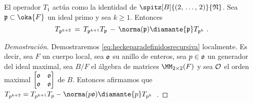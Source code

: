 \begin{propoHeckeParaDefinidosRecursiva}\label{thm:heckeparadefinidosrecursiva}
	El operador $T_{1}$ act\'{u}a como la identidad de
	$\spitz[B]{(2,\,\dots,\,2)}{\frak{N}}$. Sea $\frak{p}\subset\oka{F}$ un
	ideal primo y sea $k\geq 1$. Entonces
	\begin{equation}
		\label{eq:heckeparadefinidosrecursiva}
		T_{\frak{p}^{k+2}} \,=\,
			T_{\frak{p}^{k+1}}T_{\frak{p}} \,-\,\norma(\frak{p})
			\diamante{\frak{p}} T_{\frak{p}^{k}}
		\text{ .}
	\end{equation}
\end{propoHeckeParaDefinidosRecursiva}

\begin{proof}[Demostraci\'{o}n]
	Demostraremos \eqref{eq:heckeparadefinidosrecursiva} localmente. Es
	decir, sea $F$ un cuerpo local, sea $\frak{o}$ su anillo de enteros,
	sea $p\in\frak{o}$ un generador del ideal maximal, sea $B/F$ el
	\'{a}lgebra de matrices $\MM_{2\times 2}(F)$ y sea $\cal{O}$ el orden
	maximal
	\begin{math}
		\begin{bmatrix} \frak{o} & \frak{o} \\
		\frak{o} & \frak{o} \end{bmatrix}
	\end{math}
	de $B$. Entonces afirmamos que
	\begin{math}
		T_{p^{k+2}}=T_{p^{k+1}}T_{p}-\norma(p\frak{o})
			\diamante{p} T_{p^{k}}
	\end{math}~.


\end{proof}
